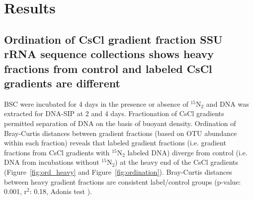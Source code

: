 \section{Results}
\subsection{Ordination of CsCl gradient fraction SSU rRNA sequence collections
shows heavy fractions from control and labeled CsCl gradients are
different} 
BSC were incubated for 4 days in the presence or absence of $^{15}$N$_{2}$ and
DNA was extracted for DNA-SIP at 2 and 4 days. Fractionation of CsCl gradients
permitted separation of DNA on the basis of buoyant density. Ordination of
Bray-Curtis \citep{Bray_1957} distances between gradient fractions (based on OTU
abundance within each fraction) reveals that labeled gradient fractions (i.e.
gradient fractions from CsCl gradients with $^{15}$N$_{2}$ labeled DNA) diverge
from control (i.e. DNA from incubations without $^{15}$N$_{2}$) at the
heavy end of the CsCl gradients (Figure~\ref{fig:ord_heavy} and
Figure~\ref{fig:ordination}). Bray-Curtis distances between heavy gradient
fractions are consistent label/control groups (p-value: 0.001, r$^{2}$: 0.18, 
Adonis test \citep{Anderson_2001}). 

